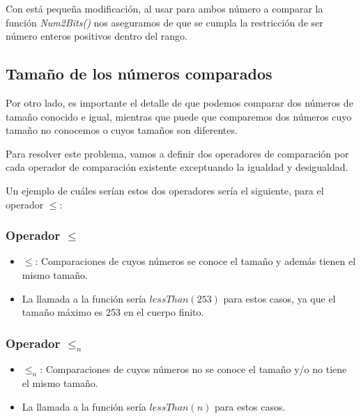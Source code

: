 \documentclass[a4paper,10pt]{article}
\begin{document}
		\vspace{0.3cm}	
		
		\noindent Con está pequeña modificación, al usar para ambos número a comparar la función \textit{Num2Bits()} nos aseguramos de que se cumpla la restricción de ser número enteros positivos dentro del rango.
		
		
		\subsection{Tamaño de los números comparados}
		\noindent Por otro lado, es importante el detalle de que podemos comparar dos números de tamaño conocido e igual, mientras que puede que comparemos dos números cuyo tamaño no conocemos o cuyos tamaños son diferentes.
		
		\vspace{0.2cm}	
			
		\noindent Para resolver este problema, vamos a definir dos operadores de comparación por cada operador de comparación existente exceptuando la igualdad y desigualdad.
		
		\vspace{1.2cm}	
		
		\noindent Un ejemplo de cuáles serían estos dos operadores sería el siguiente, para el operador $\leq$:
		
		\subsubsection{Operador $\leq$}
		\begin{itemize}
			\item $\leq$: Comparaciones de cuyos números se conoce el tamaño y además tienen el mismo tamaño.
			\item La llamada a la función sería $lessThan(253)$ para estos casos, ya que el tamaño máximo es 253 en el cuerpo finito.
		\end{itemize}
		
		\subsubsection{Operador $\leq_{n}$}
			\begin{itemize}
			\item $\leq_{n}$: Comparaciones de cuyos números no se conoce el tamaño y/o no tiene el mismo tamaño.
			\item La llamada a la función sería $lessThan(n)$ para estos casos.
		\end{itemize}
		
\end{document}
